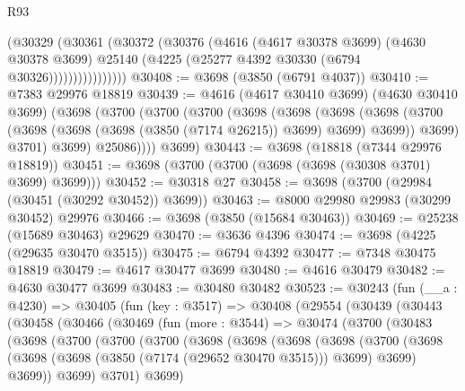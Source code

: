 \begin{lexlean}{R93}
\begin{coremodule}
                    (@30329
                      (@30361
                        (@30372
                          (@30376
                            (@4616
                              (@4617 @30378 @3699)
                              (@4630 @30378 @3699)
                              @25140
                              (@4225 (@25277 @4392 @30330 (@6794 @30326))))))))))))))))
@30408 := @3698 (@3850 (@6791 @4037))
@30410 := @7383 @29976 @18819
@30439 := @4616
    (@4617 @30410 @3699)
    (@4630 @30410 @3699)
    (@3698
      (@3700
        (@3700
          (@3700
            (@3698
              (@3698
                (@3698
                  (@3698
                    (@3700 (@3698 (@3698 (@3698 (@3850 (@7174 @26215)) @3699) @3699) @3699))
                    @3699)
                  @3701)
                @3699)
              @25086))))
      @3699)
@30443 := @3698 (@18818 (@7344 @29976 @18819))
@30451 := @3698 (@3700 (@3700 (@3698 (@3698 (@30308 @3701) @3699) @3699)))
@30452 := @30318 @27
@30458 := @3698 (@3700 (@29984 (@30451 (@30292 @30452)) @3699))
@30463 := @8000 @29980 @29983 (@30299 @30452) @29976
@30466 := @3698 (@3850 (@15684 @30463))
@30469 := @25238 (@15689 @30463) @29629
@30470 := @3636 @4396
@30474 := @3698 (@4225 (@29635 @30470 @3515))
@30475 := @6794 @4392
@30477 := @7348 @30475 @18819
@30479 := @4617 @30477 @3699
@30480 := @4616 @30479
@30482 := @4630 @30477 @3699
@30483 := @30480 @30482
@30523 := @30243
    (fun (__a : @4230) =>
    @30405
      (fun (key : @3517) =>
      @30408
        (@29554
          (@30439
            (@30443
              (@30458
                (@30466
                  (@30469
                    (fun (more : @3544) =>
                    @30474
                      (@3700
                        (@30483
                          (@3698
                            (@3700
                              (@3700
                                (@3700
                                  (@3698
                                    (@3698
                                      (@3698
                                        (@3698
                                          (@3700
                                            (@3698
                                              (@3698
                                                (@3698 (@3850 (@7174 (@29652 @30470 @3515))) @3699)
                                                @3699)
                                              @3699))
                                          @3699)
                                        @3701)
                                      @3699)

\end{coremodule}
\end{lexlean}
